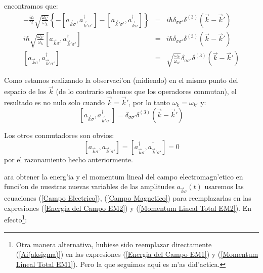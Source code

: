 encontramos que:%
\begin{eqnarray}
-\frac{i\hbar}{2}\sqrt{\frac{\omega_{k'}}{\omega_{k}}}\left\{ -\left[ a_{\vec{k}\sigma},a_{\vec{k}'\sigma '}^{\dagger}\right] -\left[ a_{\vec{k}'\sigma '},a_{\vec{k}\sigma}^{\dagger}\right] \right\} & = &i\hbar\delta_{\sigma\sigma '}\delta^{\left( 3\right) }\left( \vec{k}-\vec{k}'\right) \\
i\hbar\sqrt{\frac{\omega_{k'}}{\omega_{k}}}\left[ a_{\vec{k}\sigma},a_{\vec{k}'\sigma'}^{\dagger}\right] & = &i\hbar\delta_{\sigma\sigma '}\delta^{\left( 3\right) }\left( \vec{k}-\vec{k}'\right) \\
\left[ a_{\vec{k}\sigma},a_{\vec{k}'\sigma'}^{\dagger}\right] & = &\sqrt{\frac{\omega_{k}}{\omega_{k'}}}\delta_{\sigma\sigma '}\delta^{\left( 3\right) }\left( \vec{k}-\vec{k}'\right)
\end{eqnarray}


Como estamos realizando la observaci'on (midiendo) en el mismo punto del
espacio de los $\vec{k}$ (de lo contrario sabemos que los operadores
conmutan), el resultado es no nulo solo cuando $\vec{k}=\vec{k}'$, por lo tanto $\omega_{k}=\omega_{k'}$ y:%
\begin{equation}
\left[ a_{\vec{k}\sigma},a_{\vec{k}'\sigma '}^{\dagger}\right] =\delta_{\sigma\sigma '}\delta^{\left( 3\right) }\left( \vec{k}-\vec{k}'\right)
\end{equation}


Los otros conmutadores son obvios:%
\begin{equation}
\left[ a_{\vec{k}\sigma},a_{\vec{k}'\sigma '}\right] =\left[ a_{\vec{k}\sigma}^{\dagger},a_{\vec{k}'\sigma '}^{\dagger}\right] =0
\end{equation}
por el razonamiento hecho anteriormente.

ara obtener la energ'ia y el momentum lineal del campo electromagn'etico en funci'on de nuestras nuevas variables de las amplitudes $a_{\vec{k}\sigma}(t)$ usaremos las
ecuaciones (\ref{Campo Electrico}), (\ref{Campo Magnetico}) para reemplazarlas en las
expresiones (\ref{Energia del Campo EM2}) y (\ref{Momentum Lineal Total EM2}).
En efecto\footnote{Otra manera alternativa, hubiese sido reemplazar
directamente (\ref{Ai(aksigma)}) en las expresiones
(\ref{Energia del Campo EM1}) y (\ref{Momentum Lineal Total EM1}). Pero la que
seguimos aqui es m'as did'actica.}:%

